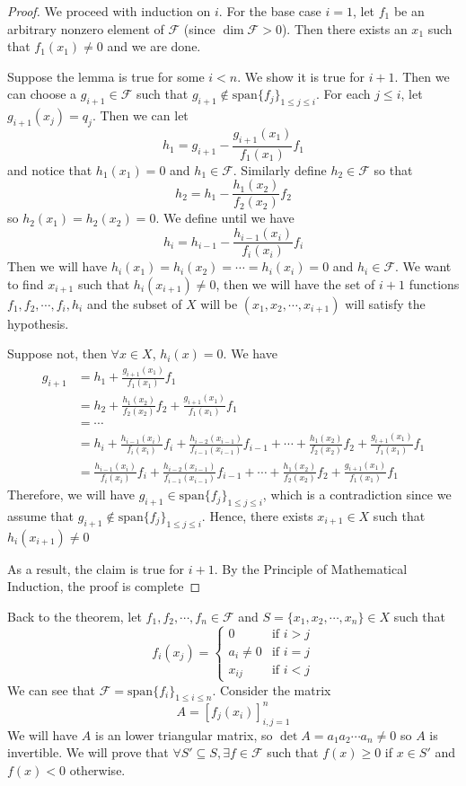 \documentclass{article}
\begin{document}
\begin{proof}
We proceed with induction on $i$. For the base case $i=1$, let $f_1$ be an arbitrary nonzero element of $\mathcal{F}$ (since $\dim \mathcal{F} > 0$). Then there exists an $x_1$ such that $f_1(x_1) \neq 0$ and we are done.

Suppose the lemma is true for some $i<n$. We show it is true for $i+1$. Then we can choose a $g_{i+1} \in \mathcal{F}$ such that $g_{i+1} \not \in \text{span}\{f_j\}_{1 \le j\le i}$. For each $j \le i$, let $g_{i+1}(x_j) = q_j$. Then we can let 
$$
h_1 = g_{i+1} - \frac{g_{i+1}(x_1)}{f_1(x_1)}f_1
$$
and notice that $h_1(x_1) = 0$ and $h_1 \in \mathcal{F}$. Similarly define $h_2 \in \mathcal{F}$ so that
$$
h_2 = h_1 - \frac{h_1(x_2)}{f_2(x_2)}f_2
$$
so $h_2(x_1)=h_2(x_2)=0$. We define until we have
$$h_{i} = h_{i-1}-\frac{h_{i-1}(x_{i})}{f_i(x_i)}f_{i}$$
Then we will have $h_i(x_1)=h_i(x_2)=\cdots=h_i(x_i)=0$ and $h_i \in \mathcal{F}$. We want to find $x_{i+1}$ such that $h_i(x_{i+1}) \neq 0$, then we will have the set of $i+1$ functions
$f_1,f_2,\cdots,f_{i},h_i$ and the subset of $X$ will be $(x_1,x_2,\cdots,x_{i+1})$ will satisfy the hypothesis.

Suppose not, then $\forall x \in X$, $h_i(x)=0$. We have
\begin{align*}
    g_{i+1}&=h_1+\frac{g_{i+1}(x_1)}{f_1(x_1)}f_1\\
    &=h_2+\frac{h_1(x_2)}{f_2(x_2)}f_2+\frac{g_{i+1}(x_1)}{f_1(x_1)}f_1\\
    &= \cdots\\
    &= h_i+\frac{h_{i-1}(x_i)}{f_i(x_i)}f_i+\frac{h_{i-2}(x_{i-1})}{f_{i-1}(x_{i-1})}f_{i-1}+\cdots+\frac{h_1(x_2)}{f_2(x_2)}
f_2+\frac{g_{i+1}(x_1)}{f_1(x_1)}f_1\\
    &= \frac{h_{i-1}(x_i)}{f_i(x_i)}f_i+\frac{h_{i-2}(x_{i-1})}{f_{i-1}(x_{i-1})}f_{i-1}+\cdots+\frac{h_1(x_2)}{f_2(x_2)}
f_2+\frac{g_{i+1}(x_1)}{f_1(x_1)}f_1
\end{align*}
Therefore, we will have $g_{i+1} \in \text{span} \{f_j \}_{1 \leq j \leq i}$, which is a contradiction since we assume that $g_{i+1} \not \in \text{span} \{f_j \}_{1 \leq j \leq i}$. Hence, there exists $x_{i+1} \in X$ such that $h_{i}(x_{i+1}) \neq 0$

As a result, the claim is true for $i+1$. By the Principle of Mathematical Induction, the proof is complete
\end{proof}
Back to the theorem, let $f_1,f_2,\cdots,f_n \in \mathcal{F}$ and $S = \{x_1,x_2,\cdots,x_n \} \in X$ such that
$$f_i(x_j) = \begin{cases}
0 & \text{if $i>j$}\\
a_i \neq 0 & \text{if $i=j$}\\
x_{ij} & \text{if $i<j$}
\end{cases}$$
We can see that $\mathcal{F} = \text{span} \{ f_i\}_{1 \leq i \leq n}$. Consider the matrix
$$A = [f_{j}(x_i)]_{i,j=1}^n $$
We will have $A$ is an lower triangular matrix, so $\det A = a_1a_2\cdots a_n \neq 0$ so $A$ is invertible. We will prove that $\forall S' \subseteq S, \exists f \in \mathcal{F}$ such that $f(x) \geq 0$ if $x \in S'$ and $f(x)<0$ otherwise.
\end{document}
